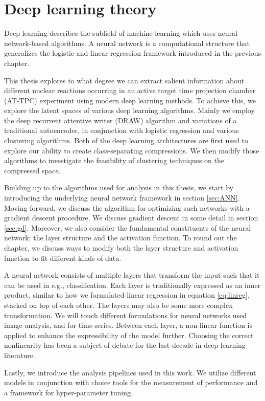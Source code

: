 \chapter{Deep learning theory}\label{ch:ml}

Deep learning describes the subfield of machine learning which uses neural network-based algorithms. A neural network is a computational structure that generalizes the logistic and linear regression framework introduced in the previous chapter.

This thesis explores to what degree we can extract salient information about different nuclear reactions occurring in an active target time projection chamber (AT-TPC) experiment using modern deep learning methods. To achieve this, we explore the latent spaces of various deep learning algorithms. Mainly we employ the deep recurrent attentive writer (DRAW) algorithm \cite{Gregor2015} and variations of a traditional autoencoder, in conjunction with logistic regression and various clustering algorithms. Both of the deep learning architectures are first used to explore our ability to create class-separating compressions. We then modify those algorithms to investigate the feasibility of clustering techniques on the compressed space. 

Building up to the algorithms used for analysis in this thesis, we start by introducing the underlying neural network framework in section \ref{sec:ANN}. Moving forward, we discuss the algorithm for optimizing such networks with a gradient descent procedure. We discuss gradient descent in some detail in section \ref{sec:gd}. Moreover, we also consider the fundamental constituents of the neural network: the layer structure and the activation function. To round out the chapter, we discuss ways to modify both the layer structure and activation function to fit different kinds of data.

A neural network consists of multiple layers that transform the input such that it can be used in e.g., classification. Each layer is traditionally expressed as an inner product, similar to how we formulated linear regression in equation \ref{eq:linreg}, stacked on top of each other. The layers may also be some more complex transformation. We will touch different formulations for neural networks used image analysis, and for time-series.  Between each layer, a non-linear function is applied to enhance the expressibility of the model further. Choosing the correct nonlinearity has been a subject of debate for the last decade in deep learning literature.

Lastly, we introduce the analysis pipelines used in this work. We utilize different models in conjunction with choice tools for the measurement of performance and a framework for hyper-parameter tuning. 